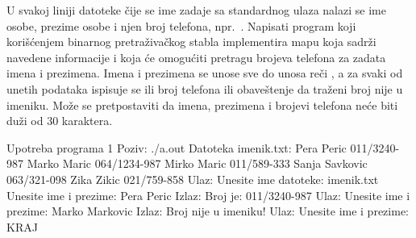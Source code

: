 \begin{Exercise}[label=704]
U svakoj liniji datoteke čije se ime zadaje sa standardnog ulaza nalazi se ime osobe, prezime osobe i njen broj telefona, npr.~. Napisati program koji korišćenjem binarnog pretraživačkog stabla implementira mapu koja sadrži navedene informacije i koja će omogućiti pretragu brojeva telefona za zadata imena i prezimena. Imena i prezimena se unose sve do unosa reči , a za svaki od unetih podataka ispisuje se ili broj telefona ili obaveštenje da traženi broj nije u imeniku. Može se pretpostaviti da imena, prezimena i brojevi telefona neće biti duži od $30$ karaktera.  

\begin{maxitest}
\begin{test}{Upotreba programa 1}
Poziv: ./a.out 
Datoteka imenik.txt:
   Pera Peric 011/3240-987
   Marko Maric 064/1234-987
   Mirko Maric 011/589-333
   Sanja Savkovic 063/321-098
   Zika Zikic 021/759-858
Ulaz:
	Unesite ime datoteke: imenik.txt
	Unesite ime i prezime: Pera Peric
Izlaz:	
	Broj je: 011/3240-987
Ulaz:	
	Unesite ime i prezime: Marko Markovic
Izlaz:
	Broj nije u imeniku!
Ulaz:	
	Unesite ime i prezime: KRAJ
\end{test}
\end{maxitest}
\end{Exercise}

\begin{Answer}[ref=704]
\end{Answer}


